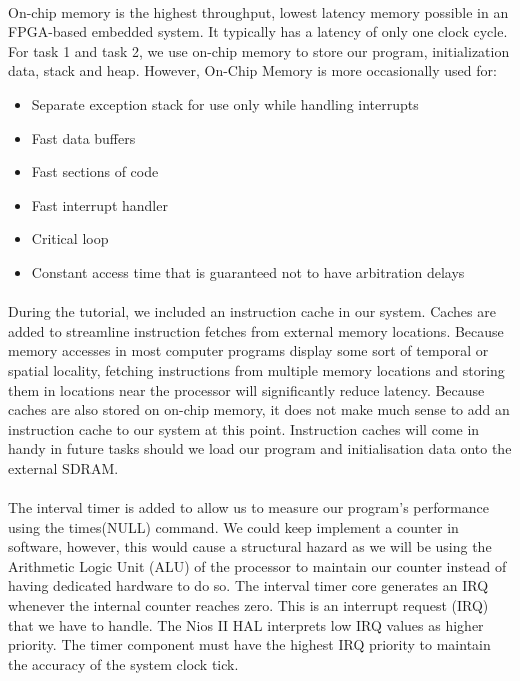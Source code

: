 \documentclass{article}
\begin{document}
\paragraph{}
On-chip memory is the highest throughput, lowest latency memory possible in an FPGA-based embedded system. It typically has a latency of only one clock cycle\cite{highest_throughput}. For task \num{1} and task \num{2}, we use on-chip memory to store our program, initialization data, stack and heap. However, On-Chip Memory is more occasionally used for:
\begin{itemize}
  \item Separate exception stack for use only while handling interrupts 
  \item Fast data buffers
  \item Fast sections of code
  \item Fast interrupt handler
  \item Critical loop
  \item Constant access time that is guaranteed not to have arbitration delays\cite{on-chip_memory}
\end{itemize}
\paragraph{}
During the tutorial, we included an instruction cache in our system. Caches are added to streamline instruction fetches from external memory locations. Because memory accesses in most computer programs display some sort of temporal or spatial locality, fetching instructions from multiple memory locations and storing them in locations near the processor will significantly reduce latency. Because caches are also stored on on-chip memory, it does not make much sense to add an instruction cache to our system at this point. Instruction caches will come in handy in future tasks should we load our program and initialisation data onto the external SDRAM.
\paragraph{}
The interval timer is added to allow us to measure our program’s performance using the times(NULL) command. We could keep implement a counter in software, however, this would cause a structural hazard as we will be using the Arithmetic Logic Unit (ALU) of the processor to maintain our counter instead of having dedicated hardware to do so. The interval timer core generates an IRQ whenever the internal counter reaches zero. This is an interrupt request (IRQ) that we have to handle. The Nios II HAL interprets low IRQ values as higher priority. The timer component must have the highest IRQ priority to maintain the accuracy of the system clock tick.\\
\end{document}
